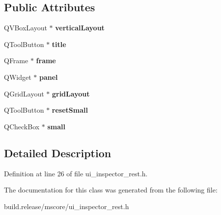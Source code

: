 \subsection*{Public Attributes}
\begin{DoxyCompactItemize}
\item 
\mbox{\label{class_ui___inspector_rest_a3b8d44b1149e9a84ad2d995b5b93ac9f}} 
Q\+V\+Box\+Layout $\ast$ {\bfseries vertical\+Layout}
\item 
\mbox{\label{class_ui___inspector_rest_af23cbdda680e5b1af07dca0ad476e0f2}} 
Q\+Tool\+Button $\ast$ {\bfseries title}
\item 
\mbox{\label{class_ui___inspector_rest_aac058203714f26bfe308bbda36f3a1a6}} 
Q\+Frame $\ast$ {\bfseries frame}
\item 
\mbox{\label{class_ui___inspector_rest_a278c8d0710e2dbe6c1b0992f8ac83ccc}} 
Q\+Widget $\ast$ {\bfseries panel}
\item 
\mbox{\label{class_ui___inspector_rest_af5ea7e44f030310daccc5280ebbf27b7}} 
Q\+Grid\+Layout $\ast$ {\bfseries grid\+Layout}
\item 
\mbox{\label{class_ui___inspector_rest_a56be85c1f6d987f0ccff620725866f44}} 
Q\+Tool\+Button $\ast$ {\bfseries reset\+Small}
\item 
\mbox{\label{class_ui___inspector_rest_af16e0fd640cd543660ec03ea7f986dfd}} 
Q\+Check\+Box $\ast$ {\bfseries small}
\end{DoxyCompactItemize}


\subsection{Detailed Description}


Definition at line 26 of file ui\+\_\+inspector\+\_\+rest.\+h.



The documentation for this class was generated from the following file\+:\begin{DoxyCompactItemize}
\item 
build.\+release/mscore/ui\+\_\+inspector\+\_\+rest.\+h\end{DoxyCompactItemize}
